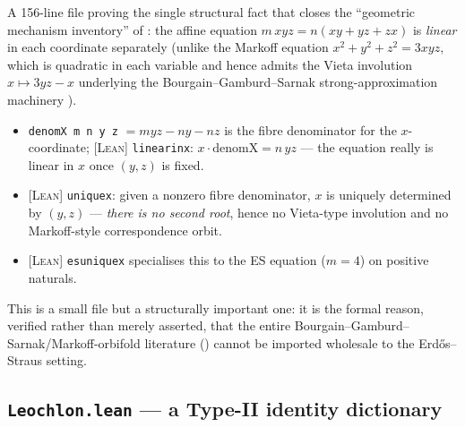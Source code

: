 \documentclass[11pt]{article}
\theoremstyle{plain}
\theoremstyle{definition}
\theoremstyle{remark}
\newcommand{\LEAN}{\textcolor{proved}{\textsc{[Lean]}}}
\newcommand{\lean}[1]{\texttt{#1}}
\renewcommand{\_}{\textunderscore\allowbreak}
\begin{document}
A 156-line file proving the single structural fact that closes the ``geometric mechanism
inventory'' of : the affine equation $m\,xyz=n(xy+yz+zx)$ is
\emph{linear} in each coordinate separately (unlike the Markoff equation
$x^2+y^2+z^2=3xyz$, which is quadratic in each variable and hence admits the Vieta involution
$x\mapsto 3yz-x$ underlying the Bourgain--Gamburd--Sarnak strong-approximation machinery
\cite{BGS2016}).
\begin{itemize}[leftmargin=1.4em]
  \item \lean{denomX m n y z} $= myz-ny-nz$ is the fibre denominator for the $x$-coordinate;
        \LEAN{} \lean{linear\_in\_x}: $x\cdot\mathrm{denomX} = n\,yz$ — the equation really is
        linear in $x$ once $(y,z)$ is fixed.
  \item \LEAN{} \lean{unique\_x}: given a nonzero fibre denominator, $x$ is uniquely determined
        by $(y,z)$ — \emph{there is no second root}, hence no Vieta-type involution and no
        Markoff-style correspondence orbit.
  \item \LEAN{} \lean{es\_unique\_x} specialises this to the ES equation ($m=4$) on positive
        naturals.
\end{itemize}
This is a small file but a structurally important one: it is the formal reason, verified rather
than merely asserted, that the entire Bourgain--Gamburd--Sarnak/Markoff-orbifold literature
() cannot be imported wholesale to the Erd\H{o}s--Straus setting.

\subsection{\lean{Leochlon.lean} — a Type-II identity dictionary}
\label{subsec:leochlon}
\end{document}
